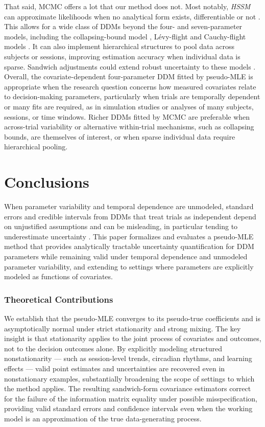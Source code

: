 \documentclass[00-main.tex]{subfiles}
\begin{document}
That said, MCMC offers a lot that our method does not. Most notably, \emph{HSSM} can approximate likelihoods when no analytical form exists, differentiable or not \citep{fengler_hssm_2026, fengler_beyond_2022, fengler_likelihood_2021}. This allows for a wide class of DDMs beyond the four- and seven-parameter models, including the collapsing-bound model \citep{drugowitsch_cost_2012}, L\'{e}vy-flight and Cauchy-flight models \citep{voss_sequential_2019}. It can also implement hierarchical structures to pool data across subjects or sessions, improving estimation accuracy when individual data is sparse. Sandwich adjustments could extend robust uncertainty to these models \citep{shaby_open-faced_2014}. Overall, the covariate-dependent four-parameter DDM fitted by pseudo-MLE is appropriate when the research question concerns how measured covariates relate to decision-making parameters, particularly when trials are temporally dependent or many fits are required, as in simulation studies or analyses of many subjects, sessions, or time windows. Richer DDMs fitted by MCMC are preferable when across-trial variability or alternative within-trial mechanisms, such as collapsing bounds, are themselves of interest, or when sparse individual data require hierarchical pooling.

\section{Conclusions}\label{sec:conclusions}
When parameter variability and temporal dependence are unmodeled, standard errors and credible intervals from DDMs that treat trials as independent depend on unjustified assumptions and can be misleading, in particular tending to underestimate uncertainty \citep{urai_structure_2025, moens_recurrent_2018}. This paper formalizes and evaluates a pseudo-MLE method that provides analytically tractable uncertainty quantification for DDM parameters while remaining valid under temporal dependence and unmodeled parameter variability, and extending to settings where parameters are explicitly modeled as functions of covariates.

\subsubsection*{Theoretical Contributions}
We establish that the pseudo-MLE converges to its pseudo-true coefficients and is asymptotically normal under strict stationarity and strong mixing. The key insight is that stationarity applies to the joint process of covariates and outcomes, not to the decision outcomes alone. By explicitly modeling structured nonstationarity --- such as session-level trends, circadian rhythms, and learning effects --- valid point estimates and uncertainties are recovered even in nonstationary examples, substantially broadening the scope of settings to which the method applies. The resulting sandwich-form covariance estimators \citep{newey_simple_1987, hansen_probability_2022} correct for the failure of the information matrix equality under possible misspecification, providing valid standard errors and confidence intervals even when the working model is an approximation of the true data-generating process.
\end{document}
